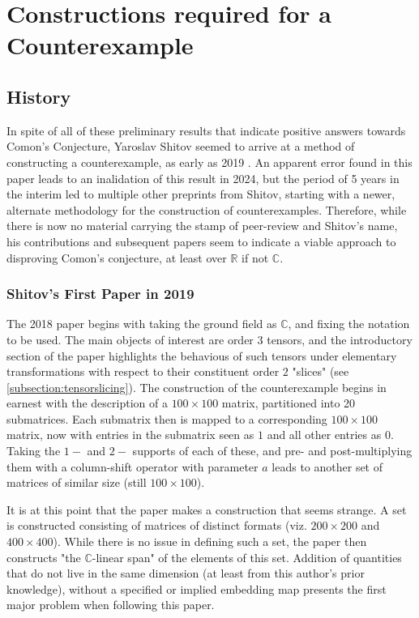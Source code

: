 \documentclass[12pt,a4paper,oneside]{book}
\def\reals{\mathbb{R}} %
\def\complex{\mathbb{C}} %
\theoremstyle{definition}
\begin{document}
\chapter{Constructions required for a Counterexample}\label{chapter:constructionsrequired}
\section{History}\label{section:historyconstructions}
In spite of all of these preliminary results that indicate positive answers towards Comon's Conjecture, Yaroslav Shitov seemed to arrive at a method of constructing a counterexample, as early as 2019 \cite{shitov_counterexample_2018}. An apparent error found in this paper leads to an inalidation of this result in 2024, but the period of 5 years in the interim led to multiple other preprints from Shitov, starting with a newer, alternate methodology for the construction of counterexamples. Therefore, while there is now no material carrying the stamp of peer-review and Shitov's name, his contributions and subsequent papers seem to indicate a viable approach to disproving Comon's conjecture, at least over $\reals$ if not $\complex$.   
\subsection{Shitov's First Paper in 2019}\label{section:shitovpaper}
The 2018 paper begins with taking the ground field as $\complex$, and fixing the notation to be used. The main objects of interest are order $3$ tensors, and the introductory section of the paper highlights the behavious of such tensors under elementary transformations with respect to their constituent order $2$ "slices" (see \cref{subsection:tensorslicing}). The construction of the counterexample begins in earnest with the description of a $100 \times 100$ matrix, partitioned into 20 submatrices. Each submatrix then is mapped to a corresponding $100 \times 100$ matrix, now with entries in the submatrix seen as $1$ and all other entries as $0$. Taking the $1-$ and $2-$ supports of each of these, and pre- and post-multiplying them with a column-shift operator with parameter $a$ leads to another set of matrices of similar size (still $100 \times 100$).

It is at this point that the paper makes a construction that seems strange. A set is constructed consisting of matrices of distinct formats (viz. $200 \times 200$ and $400 \times 400$). While there is no issue in defining such a set, the paper then constructs "the $\complex$-linear span" of the elements of this set. Addition of quantities that do not live in the same dimension (at least from this author's prior knowledge), without a specified or implied embedding map presents the first major problem when following this paper.
\end{document}
